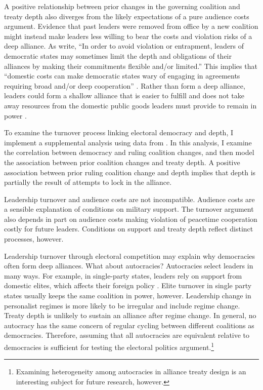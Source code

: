 \documentclass[12pt]{article}
\begin{document}
A positive relationship between prior changes in the governing coalition and treaty depth also diverges from the likely expectations of a pure audience costs argument.
Evidence that past leaders were removed from office by a new coalition might instead make leaders less willing to bear the costs and violation risks of a deep alliance.
As \citet[pg. 972]{Chibaetal2015} write, ``In order to avoid violation or entrapment, leaders of democratic states may sometimes limit the depth and obligations of their alliances by making their commitments flexible and/or limited.''
This implies that ``domestic costs can make democratic states wary of engaging in agreements requiring broad and/or deep cooperation'' \citep[pg. 980]{Chibaetal2015}. 
Rather than form a deep alliance, leaders could form a shallow alliance that is easier to fulfill and does not take away resources from the domestic public goods leaders must provide to remain in power \citep{BDMetal2002}. 


To examine the turnover process linking electoral democracy and depth, I implement a supplemental analysis using data from \citet{Mattesetal2016}. 
In this analysis, I examine the correlation between democracy and ruling coalition changes, and then model the association between prior coalition changes and treaty depth. 
A positive association between prior ruling coalition change and depth implies that depth is partially the result of attempts to lock in the alliance. 


Leadership turnover and audience costs are not incompatible. 
Audience costs are a sensible explanation of conditions on military support.
The turnover argument also depends in part on audience costs making violation of peacetime cooperation costly for future leaders. 
Conditions on support and treaty depth reflect distinct processes, however.


Leadership turnover through electoral competition may explain why democracies often form deep alliances. 
What about autocracies? 
Autocracies select leaders in many ways. 
For example, in single-party states, leaders rely on support from domestic elites, which affects their foreign policy \citep{Weeks2014}.
Elite turnover in single party states usually keeps the same coalition in power, however.  
Leadership change in personalist regimes is more likely to be irregular and include regime change.
Treaty depth is unlikely to sustain an alliance after regime change.  
In general, no autocracy has the same concern of regular cycling between different coalitions as democracies.
Therefore, assuming that all autocracies are equivalent relative to democracies is sufficient for testing the electoral politics argument.\footnote{Examining heterogeneity among autocracies in alliance treaty design is an interesting subject for future research, however.} 
\end{document}
